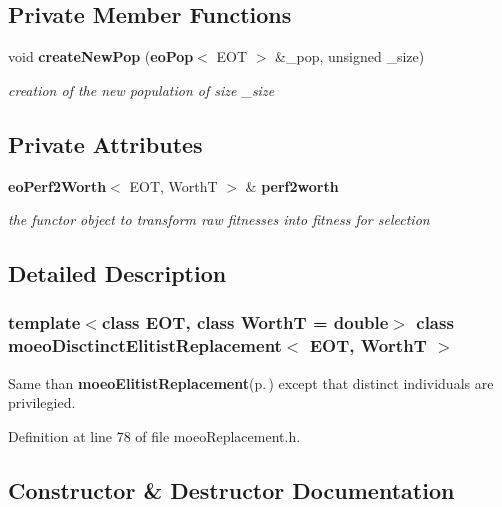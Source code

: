 \subsection*{Private Member Functions}
\begin{CompactItemize}
\item 
void {\bf create\-New\-Pop} ({\bf eo\-Pop}$<$ EOT $>$ \&\_\-pop, unsigned \_\-size)
\begin{CompactList}\small\item\em creation of the new population of size \_\-size \item\end{CompactList}\end{CompactItemize}
\subsection*{Private Attributes}
\begin{CompactItemize}
\item 
{\bf eo\-Perf2Worth}$<$ EOT, Worth\-T $>$ \& {\bf perf2worth}\label{classmoeoDisctinctElitistReplacement_3d1616ba57c10f5a77e0ec021cc8beb2}

\begin{CompactList}\small\item\em the functor object to transform raw fitnesses into fitness for selection \item\end{CompactList}\end{CompactItemize}


\subsection{Detailed Description}
\subsubsection*{template$<$class EOT, class Worth\-T = double$>$ class moeo\-Disctinct\-Elitist\-Replacement$<$ EOT, Worth\-T $>$}

Same than {\bf moeo\-Elitist\-Replacement}{\rm (p.\,\pageref{classmoeoElitistReplacement})} except that distinct individuals are privilegied. 



Definition at line 78 of file moeo\-Replacement.h.

\subsection{Constructor \& Destructor Documentation}
